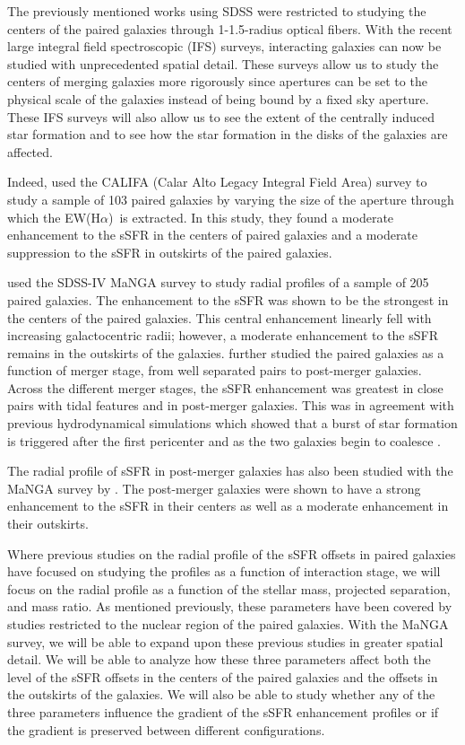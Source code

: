 \documentclass[apj,twocolumn]{emulateapj}
\newcommand{\ewha}{EW(H$\alpha$)}
\begin{document}
\begin{CJK*}{UTF8}{gbsn}
The previously mentioned works using SDSS were restricted to studying the centers of the paired galaxies through 1-1.5\arcsec-radius optical fibers. With the recent large integral field spectroscopic (IFS) surveys, interacting galaxies can now be studied with unprecedented spatial detail. These surveys allow us to study the centers of merging galaxies more rigorously since apertures can be set to the physical scale of the galaxies instead of being bound by a fixed sky aperture. These IFS surveys will also allow us to see the extent of the centrally induced star formation and to see how the star formation in the disks of the galaxies are affected. 

Indeed, \citet{Barrera-Ballesteros:2015} used the CALIFA (Calar Alto Legacy Integral Field Area) survey to study a sample of 103 paired galaxies by varying the size of the aperture through which the \ewha\ is extracted. In this study, they found a moderate enhancement to the sSFR in the centers of paired galaxies and a moderate suppression to the sSFR in outskirts of the paired galaxies. 

\citet{Pan:2019} used the SDSS-IV MaNGA survey to study radial profiles of a sample of 205 paired galaxies. The enhancement to the sSFR was shown to be the strongest in the centers of the paired galaxies. This central enhancement linearly fell with increasing galactocentric radii; however, a moderate enhancement to the sSFR remains in the outskirts of the galaxies. \citet{Pan:2019} further studied the paired galaxies as a function of merger stage, from well separated pairs to post-merger galaxies. Across the different merger stages, the sSFR enhancement was greatest in close pairs with tidal features and in post-merger galaxies. This was in agreement with previous hydrodynamical simulations which showed that a burst of star formation is triggered after the first pericenter and as the two galaxies begin to coalesce \citep{Scudder:2012}. 

The radial profile of sSFR in post-merger galaxies has also been studied with the MaNGA survey by \citet{Thorp:2019}. The post-merger galaxies were shown to have a strong enhancement to the sSFR in their centers as well as a moderate enhancement in their outskirts. 

Where previous studies on the radial profile of the sSFR offsets in paired galaxies have focused on studying the profiles as a function of interaction stage, we will focus on the radial profile as a function of the stellar mass, projected separation, and mass ratio. As mentioned previously, these parameters have been covered by studies restricted to the nuclear region of the paired galaxies. With the MaNGA survey, we will be able to expand upon these previous studies in greater spatial detail. We will be able to analyze how these three parameters affect both the level of the sSFR offsets in the centers of the paired galaxies and the offsets in the outskirts of the galaxies. We will also be able to study whether any of the three parameters influence the gradient of the sSFR enhancement profiles or if the gradient is preserved between different configurations. 


\end{CJK*}
\end{document}
